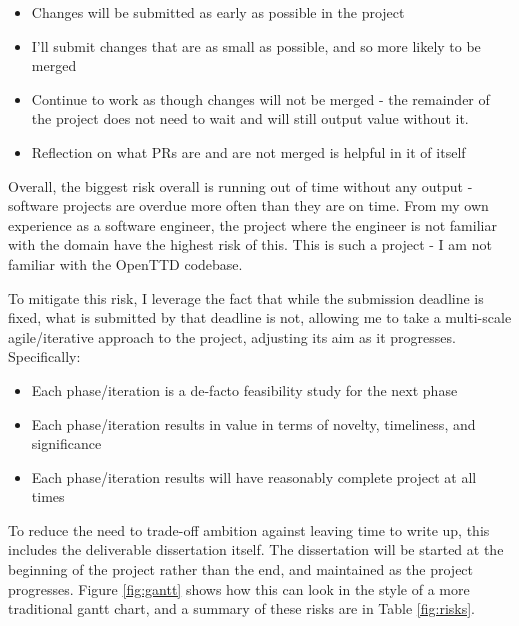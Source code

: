 \documentclass[a4paper,11pt]{article}
\begin{document}
\begin{itemize}
    \item Changes will be submitted as early as possible in the project
    \item I'll submit changes that are as small as possible, and so more likely to be merged
    \item Continue to work as though changes will not be merged - the remainder of the project does not need to wait and will still output value without it.
    \item Reflection on what PRs are and are not merged is helpful in it of itself
\end{itemize}

Overall, the biggest risk overall is running out of time without any output - software projects are overdue more often than they are on time. From my own experience as a software engineer, the project where the engineer is not familiar with the domain have the highest risk of this. This is such a project - I am not familiar with the OpenTTD codebase.

To mitigate this risk, I leverage the fact that while the submission deadline is fixed, what is submitted by that deadline is not, allowing me to take a multi-scale agile/iterative approach to the project, adjusting its aim as it progresses. Specifically:

\begin{itemize}
    \item Each phase/iteration is a de-facto feasibility study for the next phase
    \item Each phase/iteration results in value in terms of novelty, timeliness, and significance
    \item Each phase/iteration results will have reasonably complete project at all times
\end{itemize}

To reduce the need to trade-off ambition against leaving time to write up, this includes the deliverable dissertation itself. The dissertation will be started at the beginning of the project rather than the end, and maintained as the project progresses. Figure \ref{fig:gantt} shows how this can look in the style of a more traditional gantt chart, and a summary of these risks are in Table \ref{fig:risks}.
\end{document}
